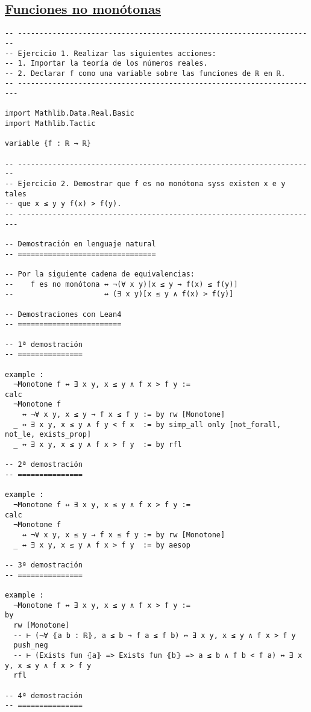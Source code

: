 \subsection{\href{./src/Logica/Funciones\_no\_monotonas.lean}{Funciones no monótonas}}
\label{sec:orgd7067d5}
\begin{verbatim}
-- ---------------------------------------------------------------------
-- Ejercicio 1. Realizar las siguientes acciones:
-- 1. Importar la teoría de los números reales.
-- 2. Declarar f como una variable sobre las funciones de ℝ en ℝ.
-- ----------------------------------------------------------------------

import Mathlib.Data.Real.Basic
import Mathlib.Tactic

variable {f : ℝ → ℝ}

-- ---------------------------------------------------------------------
-- Ejercicio 2. Demostrar que f es no monótona syss existen x e y tales
-- que x ≤ y y f(x) > f(y).
-- ----------------------------------------------------------------------

-- Demostración en lenguaje natural
-- ================================

-- Por la siguiente cadena de equivalencias:
--    f es no monótona ↔ ¬(∀ x y)[x ≤ y → f(x) ≤ f(y)]
--                     ↔ (∃ x y)[x ≤ y ∧ f(x) > f(y)]

-- Demostraciones con Lean4
-- ========================

-- 1ª demostración
-- ===============

example :
  ¬Monotone f ↔ ∃ x y, x ≤ y ∧ f x > f y :=
calc
  ¬Monotone f
    ↔ ¬∀ x y, x ≤ y → f x ≤ f y := by rw [Monotone]
  _ ↔ ∃ x y, x ≤ y ∧ f y < f x  := by simp_all only [not_forall, not_le, exists_prop]
  _ ↔ ∃ x y, x ≤ y ∧ f x > f y  := by rfl

-- 2ª demostración
-- ===============

example :
  ¬Monotone f ↔ ∃ x y, x ≤ y ∧ f x > f y :=
calc
  ¬Monotone f
    ↔ ¬∀ x y, x ≤ y → f x ≤ f y := by rw [Monotone]
  _ ↔ ∃ x y, x ≤ y ∧ f x > f y  := by aesop

-- 3ª demostración
-- ===============

example :
  ¬Monotone f ↔ ∃ x y, x ≤ y ∧ f x > f y :=
by
  rw [Monotone]
  -- ⊢ (¬∀ ⦃a b : ℝ⦄, a ≤ b → f a ≤ f b) ↔ ∃ x y, x ≤ y ∧ f x > f y
  push_neg
  -- ⊢ (Exists fun ⦃a⦄ => Exists fun ⦃b⦄ => a ≤ b ∧ f b < f a) ↔ ∃ x y, x ≤ y ∧ f x > f y
  rfl

-- 4ª demostración
-- ===============


\end{verbatim}
